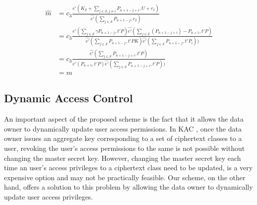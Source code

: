 \begin{scriptsize}
\begin{equation*}
\label{eq:correctness}
\begin{split}
 \hat{m} &= c_3\frac{\hat{e'}(K_{\mathcal{S}}+\sum_{j\in\mathcal{S},j\neq i}P_{n+1-j+i},U+c_1)}{\hat{e'}(\sum_{j\in\mathcal{S}}P_{n+1-j},c_2)}\\
  &= c_3\frac{\hat{e'}(\sum_{j\in \mathcal{S}}{\gamma}P_{n+1-j},t'P)\hat{e'}(\sum_{j\in\mathcal{S}}(P_{n+1-j+i})-P_{n+1},t'P)}{\hat{e'}(\sum_{j\in\mathcal{S}}P_{n+1-j},t'PK)\hat{e'}(\sum_{j\in\mathcal{S}}P_{n+1-j},t'P_i))}\\
  &= c_3\frac{\hat{e'}(\sum_{j\in\mathcal{S}}P_{n+1-j+i},t'P)}{\hat{e'}(P_{n+1},t'P)\hat{e'}(\sum_{j\in\mathcal{S}}P_{n+1-j+i},t'P))}\\
  &= m
\end{split}  
\end{equation*}
\end{scriptsize}


\subsection{Dynamic Access Control}
\label{subsec:dynamic}

An important aspect of the proposed scheme is the fact that it allows the data owner to dynamically update user access permissions. In KAC \cite{chu2014key}, once the data owner issues an aggregate key corresponding to a set of ciphertext classes to a user, revoking the user's access permissions to the same is not possible without changing the master secret key. However, changing the master secret key each time an user's access privileges to a ciphertext class need to be updated, is a very expensive option and may not be practically feasible. Our scheme, on the other hand, offers a solution to this problem by allowing the data owner to dynamically update user access privileges.

